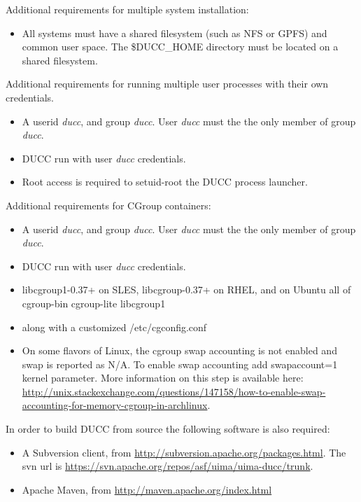 Additional requirements for multiple system installation:

\begin{itemize}
  \item All systems must have a shared filesystem (such as NFS or GPFS) and common user space.
        The \$DUCC\_HOME directory must be located on a shared filesystem.
\end{itemize}
  
Additional requirements for running multiple user processes with their own credentials.

\begin{itemize}
  \item A userid {\em ducc}, and group {\em ducc}.  User {\em ducc} must the the only member of group {\em ducc}.
  \item DUCC run with user {\em ducc} credentials.
  \item Root access is required to setuid-root the DUCC process launcher.
\end{itemize}
  
Additional requirements for CGroup containers:

\begin{itemize}
  \item A userid {\em ducc}, and group {\em ducc}.  User {\em ducc} must the the only member of group {\em ducc}.
  \item DUCC run with user {\em ducc} credentials.
  \item libcgroup1-0.37+ on SLES, libcgroup-0.37+ on RHEL, and on Ubuntu all of cgroup-bin cgroup-lite libcgroup1
  \item along with a customized /etc/cgconfig.conf
  \item On some flavors of Linux, the cgroup swap accounting is not enabled and swap is reported as N/A. To enable swap accounting add swapaccount=1 kernel parameter. More information on this step is available here: \url{http://unix.stackexchange.com/questions/147158/how-to-enable-swap-accounting-for-memory-cgroup-in-archlinux}.  
\end{itemize}

  
In order to build DUCC from source the following software is also required:
\begin{itemize}
    \item A Subversion client, from \url{http://subversion.apache.org/packages.html}.  The
      svn url is \url{https://svn.apache.org/repos/asf/uima/uima-ducc/trunk}.
    \item Apache Maven, from \url{http://maven.apache.org/index.html}
\end{itemize}

